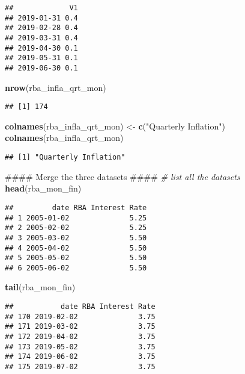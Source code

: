 \documentclass[]{article}
\newenvironment{Shaded}{\begin{snugshade}}{\end{snugshade}}
\newcommand{\KeywordTok}[1]{\textcolor[rgb]{0.13,0.29,0.53}{\textbf{#1}}}
\newcommand{\StringTok}[1]{\textcolor[rgb]{0.31,0.60,0.02}{#1}}
\newcommand{\CommentTok}[1]{\textcolor[rgb]{0.56,0.35,0.01}{\textit{#1}}}
\newcommand{\NormalTok}[1]{#1}
\begin{document}
\begin{verbatim}
##             V1
## 2019-01-31 0.4
## 2019-02-28 0.4
## 2019-03-31 0.4
## 2019-04-30 0.1
## 2019-05-31 0.1
## 2019-06-30 0.1
\end{verbatim}

\begin{Shaded}
\begin{Highlighting}[]
      \KeywordTok{nrow}\NormalTok{(rba_infla_qrt_mon)}
\end{Highlighting}
\end{Shaded}

\begin{verbatim}
## [1] 174
\end{verbatim}

\begin{Shaded}
\begin{Highlighting}[]
      \KeywordTok{colnames}\NormalTok{(rba_infla_qrt_mon) <-}\StringTok{ }\KeywordTok{c}\NormalTok{(}\StringTok{"Quarterly Inflation"}\NormalTok{)}
      \KeywordTok{colnames}\NormalTok{(rba_infla_qrt_mon)}
\end{Highlighting}
\end{Shaded}

\begin{verbatim}
## [1] "Quarterly Inflation"
\end{verbatim}

\begin{Shaded}
\begin{Highlighting}[]
\NormalTok{  #### Merge the three datasets ####}
    \CommentTok{# list all the datasets}
    \KeywordTok{head}\NormalTok{(rba_mon_fin)}
\end{Highlighting}
\end{Shaded}

\begin{verbatim}
##         date RBA Interest Rate
## 1 2005-01-02              5.25
## 2 2005-02-02              5.25
## 3 2005-03-02              5.50
## 4 2005-04-02              5.50
## 5 2005-05-02              5.50
## 6 2005-06-02              5.50
\end{verbatim}

\begin{Shaded}
\begin{Highlighting}[]
    \KeywordTok{tail}\NormalTok{(rba_mon_fin)}
\end{Highlighting}
\end{Shaded}

\begin{verbatim}
##           date RBA Interest Rate
## 170 2019-02-02              3.75
## 171 2019-03-02              3.75
## 172 2019-04-02              3.75
## 173 2019-05-02              3.75
## 174 2019-06-02              3.75
## 175 2019-07-02              3.75
\end{verbatim}
\end{document}
